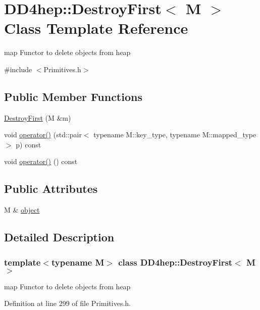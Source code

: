 \hypertarget{class_d_d4hep_1_1_destroy_first}{
\section{DD4hep::DestroyFirst$<$ M $>$ Class Template Reference}
\label{class_d_d4hep_1_1_destroy_first}
}


map Functor to delete objects from heap  


{\ttfamily \#include $<$Primitives.h$>$}\subsection*{Public Member Functions}
\begin{DoxyCompactItemize}
\item 
\hyperlink{class_d_d4hep_1_1_destroy_first_a2ab7069ab1062311f4ad6e7c5e93d340}{DestroyFirst} (M \&m)
\item 
void \hyperlink{class_d_d4hep_1_1_destroy_first_a05bc6ba28234f2ec296ac9a8185cca4b}{operator()} (std::pair$<$ typename M::key\_\-type, typename M::mapped\_\-type $>$ p) const 
\item 
void \hyperlink{class_d_d4hep_1_1_destroy_first_a81183efd460f5215e850f72a444f3716}{operator()} () const 
\end{DoxyCompactItemize}
\subsection*{Public Attributes}
\begin{DoxyCompactItemize}
\item 
M \& \hyperlink{class_d_d4hep_1_1_destroy_first_a18b46ba57a4b4115bbfd3774f8632ea1}{object}
\end{DoxyCompactItemize}


\subsection{Detailed Description}
\subsubsection*{template$<$typename M$>$ class DD4hep::DestroyFirst$<$ M $>$}

map Functor to delete objects from heap 

Definition at line 299 of file Primitives.h.

